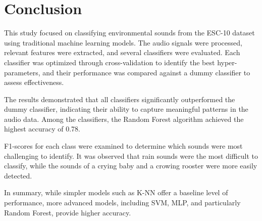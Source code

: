 \documentclass[journal]{IEEEtran}
\begin{document}


\section{Conclusion}
This study focused on classifying environmental sounds from the ESC-10 dataset using traditional machine learning models. The audio signals were processed, relevant features were extracted, and several classifiers were evaluated. Each classifier was optimized through cross-validation to identify the best hyper-parameters, and their performance was compared against a dummy classifier to assess effectiveness.

The results demonstrated that all classifiers significantly outperformed the dummy classifier, indicating their ability to capture meaningful patterns in the audio data. Among the classifiers, the Random Forest algorithm achieved the highest accuracy of 0.78.

F1-scores for each class were examined to determine which sounds were most challenging to identify. It was observed that rain sounds were the most difficult to classify, while the sounds of a crying baby and a crowing rooster were more easily detected.

In summary, while simpler models such as K-NN offer a baseline level of performance, more advanced models, including SVM, MLP, and particularly Random Forest, provide higher accuracy.


%
\end{document}
